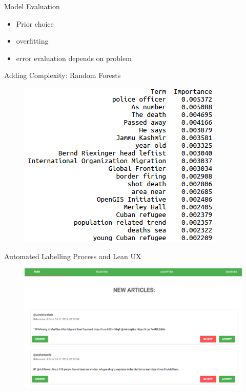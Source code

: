 \documentclass{beamer}
\begin{document}
\begin{frame}{Model Evaluation}

\begin{itemize}
	\item Prior choice  
	\item overfitting  
	\item error evaluation depends on problem 
\end{itemize}
\end{frame}

\begin{frame}{Adding Complexity: Random Forests}

\begin{figure}
\centering

\includegraphics[scale=0.5]{randomforestvis.png}
\label{randomforest}

\end{figure}

\end{frame}


\begin{frame}{Automated Labelling Process and Lean UX}

\begin{figure}[H]
\centering
\includegraphics[scale=0.25]{UI.png}
\label{heat}
\end{figure}

\href{http://migrantnews-web.s3-website-eu-west-1.amazonaws.com/}{}

\end{frame}
\end{document}
